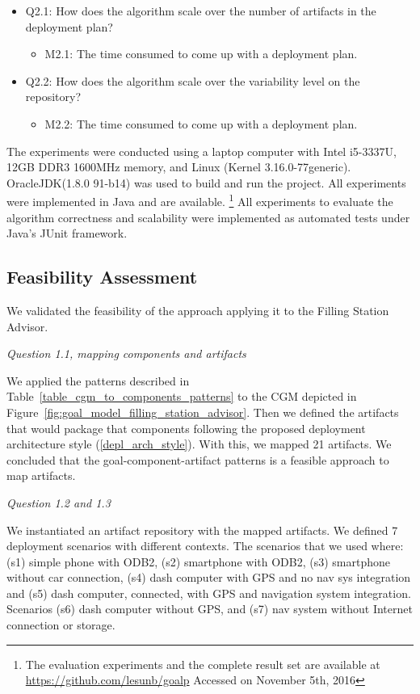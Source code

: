\begin{itemize}
  \item Q2.1: How does the algorithm scale over the number of artifacts in the deployment plan?
  \begin{itemize}
    \item M2.1: The time consumed to come up with a deployment plan.
  \end{itemize}

  \item Q2.2: How does the algorithm scale over the variability level on the repository?
  \begin{itemize}
    \item M2.2: The time consumed to come up with a deployment plan.
  \end{itemize}
\end{itemize}

The experiments were conducted using a laptop computer with Intel i5-3337U, 12GB DDR3 1600MHz memory, and Linux (Kernel 3.16.0-77generic). OracleJDK(1.8.0 91-b14) was used to build and run the project. All experiments were implemented in Java and are available.
\footnote{The evaluation experiments and the complete result set are available at
\url{https://github.com/lesunb/goalp} Accessed on November 5th, 2016}
All experiments to evaluate the algorithm correctness and scalability
were implemented as automated tests under Java’s JUnit framework.

\subsection{Feasibility Assessment}

We validated the feasibility of the approach applying it to the Filling Station Advisor.

\emph{Question 1.1, mapping components and artifacts }

We applied the patterns described in Table~\ref{table_cgm_to_components_patterns} to the CGM depicted in Figure~\ref{fig:goal_model_filling_station_advisor}. Then we defined the artifacts that would package that components following the proposed deployment architecture style (\ref{depl_arch_style}). With this, we mapped 21 artifacts. We concluded that the goal-component-artifact patterns is a feasible approach to map artifacts.

\emph{Question 1.2 and 1.3}

We instantiated an artifact repository with the mapped artifacts. We defined 7 deployment scenarios with different contexts. The scenarios that we used where: (s1) simple phone with ODB2, (s2) smartphone with ODB2, (s3) smartphone without car connection, (s4) dash computer with GPS and no nav sys integration and (s5) dash computer, connected, with GPS and navigation system integration. Scenarios (s6) dash computer without GPS, and (s7) nav system without Internet connection or storage.

